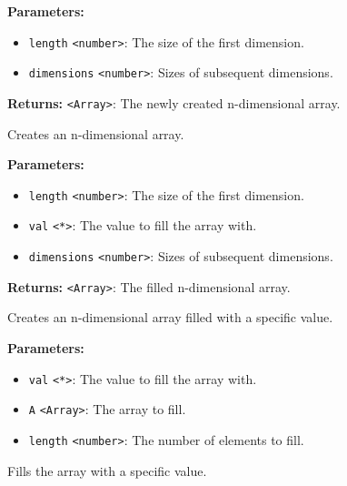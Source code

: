 \documentclass[12pt,a4paper]{article}
\begin{document}
\noindent \textbf{Parameters:}
\begin{itemize}
  \item \texttt{length} \texttt{<number>}: The size of the first dimension.
  \item \texttt{dimensions} \texttt{<number>}: Sizes of subsequent dimensions.
\end{itemize}

\noindent \textbf{Returns:} \texttt{<Array>}: The newly created n-dimensional array.

\noindent Creates an n-dimensional array.

\vspace{5mm}
\noindent {}


\noindent \textbf{Parameters:}
\begin{itemize}
  \item \texttt{length} \texttt{<number>}: The size of the first dimension.
  \item \texttt{val} \texttt{<*>}: The value to fill the array with.
  \item \texttt{dimensions} \texttt{<number>}: Sizes of subsequent dimensions.
\end{itemize}

\noindent \textbf{Returns:} \texttt{<Array>}: The filled n-dimensional array.

\noindent Creates an n-dimensional array filled with a specific value.

\vspace{5mm}
\noindent {}


\noindent \textbf{Parameters:}
\begin{itemize}
  \item \texttt{val} \texttt{<*>}: The value to fill the array with.
  \item \texttt{A} \texttt{<Array>}: The array to fill.
  \item \texttt{length} \texttt{<number>}: The number of elements to fill.
\end{itemize}

\noindent Fills the array with a specific value.

\vspace{5mm}
\noindent {}
\end{document}
